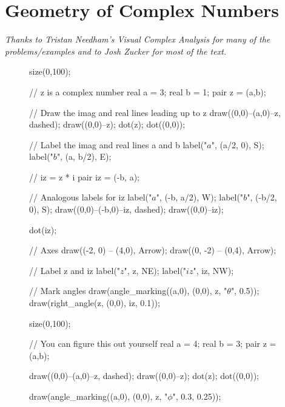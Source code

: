 \documentclass[../textbook.tex]{subfiles}
\begin{document}
\section{Geometry of Complex Numbers}

\noindent\textit{Thanks to Tristan Needham's \emph{Visual Complex Analysis} for many of the problems/examples and to Josh Zucker for most of the text.}

\begin{figure}[h]
	\begin{center}
		\begin{minipage}[b]{0.25\textwidth}
			\centering
			\begin{asy}[width=\textwidth]
				size(0,100);

				// z is a complex number
				real a = 3;
				real b = 1;
				pair z = (a,b);

				// Draw the imag and real lines leading up to z
				draw((0,0)--(a,0)--z, dashed);
				draw((0,0)--z);
				dot(z);
				dot((0,0));

				// Label the imag and real lines a and b
				label("$a$", (a/2, 0), S);
				label("$b$", (a, b/2), E);

				// iz = z * i
				pair iz = (-b, a);

				// Analogous labels for iz
				label("$a$", (-b, a/2), W);
				label("$b$", (-b/2, 0), S);
				draw((0,0)--(-b,0)--iz, dashed);
				draw((0,0)--iz);

				dot(iz);

				// Axes
				draw((-2, 0) -- (4,0), Arrow);
				draw((0, -2) -- (0,4), Arrow);

				// Label z and iz
				label("$z$", z, NE);
				label("$iz$", iz, NW);

				// Mark angles
				draw(angle_marking((a,0), (0,0), z, "$\theta$", 0.5));
				draw(right_angle(z, (0,0), iz, 0.1));
			\end{asy}
		\end{minipage}
		\hfill
		\begin{minipage}[b]{0.25\textwidth}
			\centering
			\begin{asy}[width=\textwidth]
				size(0,100);

				// You can figure this out yourself
				real a = 4;
				real b = 3;
				pair z = (a,b);

				draw((0,0)--(a,0)--z, dashed);
				draw((0,0)--z);
				dot(z);
				dot((0,0));

				draw(angle_marking((a,0), (0,0), z, "$\phi$", 0.3, 0.25));


\end{asy}
\end{minipage}
\end{center}
\end{figure}
\end{document}
